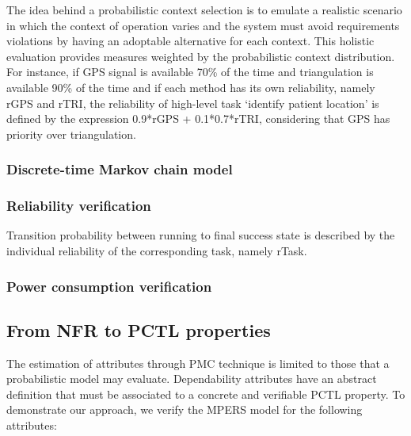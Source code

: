 The idea behind a probabilistic context selection is to emulate a realistic scenario in which the context of operation varies and the system must avoid requirements violations by  having an adoptable alternative for each context. This holistic evaluation provides measures weighted by the probabilistic context distribution. For instance, if GPS signal is available 70\% of the time and triangulation is available 90\% of the time and if each method has its own reliability, namely rGPS and rTRI, the reliability of high-level task `identify patient location' is defined by the expression 0.9*rGPS + 0.1*0.7*rTRI, considering that GPS has priority over triangulation. 


\subsubsection{Discrete-time Markov chain model}



\subsubsection{Reliability verification}

Transition probability between running to final success state is described by the individual reliability of the corresponding task, namely rTask. 

\subsubsection{Power consumption verification}



\subsection{From NFR to PCTL properties}

The estimation of attributes through PMC technique is limited to those that a probabilistic model may evaluate. Dependability attributes have an abstract definition that must be associated to a concrete and verifiable PCTL property. To demonstrate our approach, we verify the MPERS model for the following attributes:

